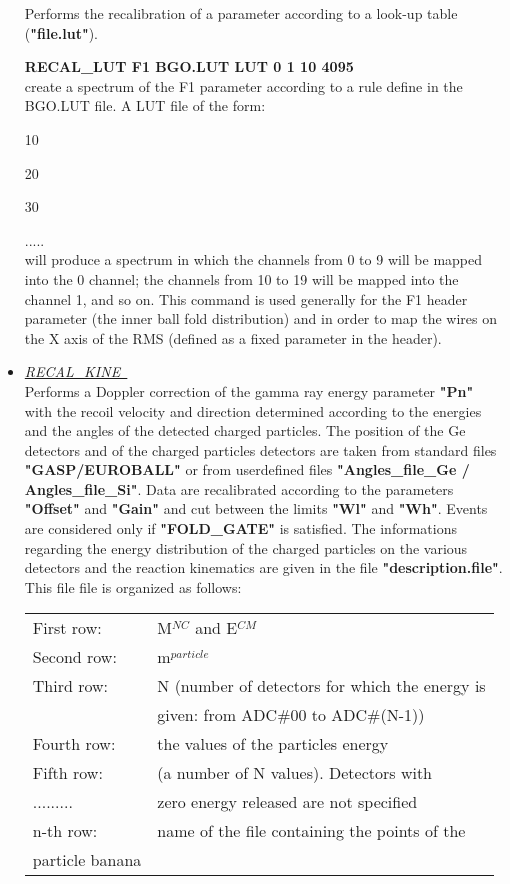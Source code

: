 \begin{itemize}
	Performs the recalibration of a parameter according to a look-up 
	table ({\bf "file.lut"}). 

	\hskip1cm {\bf RECAL\_LUT F1 BGO.LUT LUT 0 1 10 4095} \\
	create a spectrum of the F1 parameter  
	according to a rule define in the BGO.LUT file. A LUT file of
	the form:
	
	\hskip1.5cm 10
 
	\hskip1.5cm 20
 
	\hskip1.5cm 30

	\hskip1.5cm .....\\
	will produce a spectrum in which the channels from 0 to 9
	will be mapped into the 0 channel; the channels 
	from 10 to 19 will be mapped into the channel 1, and so on.
	This command is used generally for the F1 header parameter 
	(the inner
	ball fold distribution) and in order to map the wires on 
	the X axis of the RMS (defined as a fixed parameter in the header). 

 \item	{\it\underline{RECAL\_KINE~}}\footnotemark[2] \\

	Performs a Doppler correction of the gamma ray energy parameter 
	{\bf "Pn"} with the recoil velocity and direction determined
	according to the energies and the angles of the detected charged 
	particles. The position of the Ge detectors and of the charged
	particles detectors are taken from standard files {\bf "GASP/EUROBALL"}
	or from userdefined files {\bf "Angles\_file\_Ge / Angles\_file\_Si"}.
	Data are recalibrated according to the parameters {\bf "Offset"} and
	{\bf "Gain"} and cut between the limits {\bf "Wl"} and {\bf "Wh"}.
	Events are considered only if {\bf "FOLD\_GATE"} is satisfied.
	The informations regarding the energy distribution of the charged
	particles on the various detectors and the reaction kinematics are
	given in the file {\bf "description.file"}. This file file is organized
	as follows:
	\begin{center}
	\begin{tabular}{ll}
	First row: 	& M$^{NC}$ and E$^{CM}$ 			 \\
	Second row:   	& m$^{particle}$				 \\
	Third row:	& N (number of detectors for which the energy is \\
			& 	given: from ADC\#00 to ADC\#(N-1))	 \\
	Fourth row:  	& the values of the particles energy 		 \\
	Fifth row:  	& (a number of N values). Detectors with 	 \\
	......... 	& zero energy released are not specified	 \\
	n-th row:  	& name of the file containing the points of the  \\
				particle banana				 
	\end{tabular}
	\end{center}


\end{itemize}

